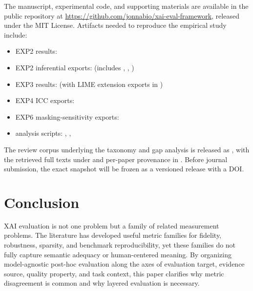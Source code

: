 \documentclass[twoside,11pt]{article}
\begin{document}
The manuscript, experimental code, and supporting materials are available
in the public repository at
\url{https://github.com/jonnabio/xai-eval-framework}, released under the
MIT License. Artifacts needed to reproduce the empirical study include:
\begin{sloppypar}
\begin{itemize}[leftmargin=*]
\item EXP2 results: 
\item EXP2 inferential exports: 
(includes ,
,
)
\item EXP3 results: 
(with LIME extension exports in )
\item EXP4 ICC exports: 
\item EXP6 masking-sensitivity exports:
\item analysis scripts: ,
,
\end{itemize}
\end{sloppypar}

The review corpus underlying the taxonomy and gap analysis is released as
, with the retrieved
full texts under  and per-paper
provenance in . Before journal submission, the
exact snapshot will be frozen as a versioned release with a DOI.

\section{Conclusion}
\label{sec:conclusion}

XAI evaluation is not one problem but a family of related measurement
problems. The literature has developed useful metric families for fidelity,
robustness, sparsity, and benchmark reproducibility, yet these families do
not fully capture semantic adequacy or human-centered meaning. By
organizing model-agnostic post-hoc evaluation along the axes of evaluation
target, evidence source, quality property, and task context, this paper
clarifies why metric disagreement is common and why layered evaluation is
necessary.
\end{document}
